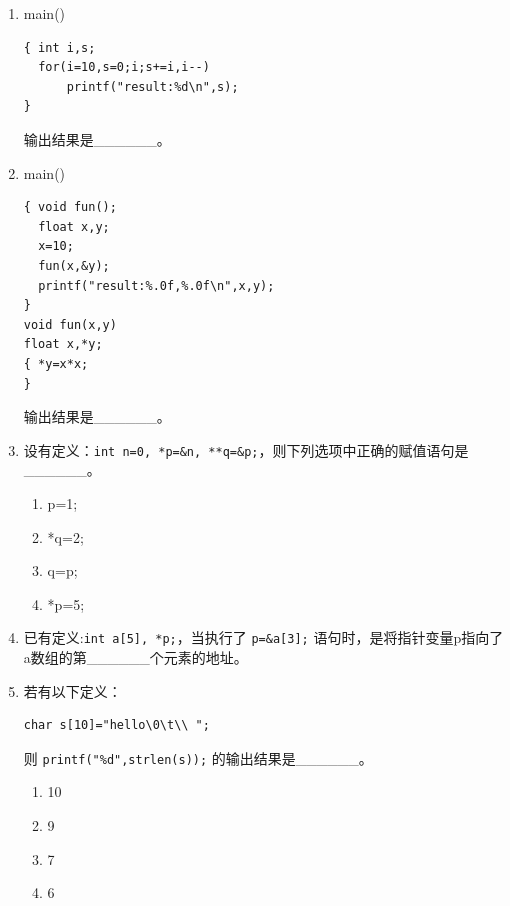 \documentclass[a4paper,12pt]{article}
\begin{document}
\begin{enumerate}
	\item main()
	      \begin{verbatim}
{ int i,s;
  for(i=10,s=0;i;s+=i,i--)
      printf("result:%d\n",s);
}
    \end{verbatim}
	      输出结果是\_\_\_\_\_\_。
	      \vspace{0.3cm}

	\item main()
	      \begin{verbatim}
{ void fun();
  float x,y;
  x=10;
  fun(x,&y);
  printf("result:%.0f,%.0f\n",x,y);
}
void fun(x,y)
float x,*y;
{ *y=x*x;
}
    \end{verbatim}
	      输出结果是\_\_\_\_\_\_。
	      \vspace{0.3cm}

	\item 设有定义：\texttt{int n=0, *p=\&n, **q=\&p;}，则下列选项中正确的赋值语句是\_\_\_\_\_\_。
	      \begin{enumerate}
		      \item[A)] p=1;
		      \item[B)] *q=2;
		      \item[C)] q=p;
		      \item[D)] *p=5;
	      \end{enumerate}
	      \vspace{0.3cm}

	\item 已有定义:\texttt{int a[5], *p;}，当执行了 \texttt{p=\&a[3];} 语句时，是将指针变量p指向了a数组的第\_\_\_\_\_\_个元素的地址。
	      \vspace{0.3cm}

	\item 若有以下定义：
	      \begin{verbatim}
char s[10]="hello\0\t\\ ";
      \end{verbatim}
	      则 \texttt{printf("\%d",strlen(s));} 的输出结果是\_\_\_\_\_\_。
	      \begin{enumerate}
		      \item[A)] 10
		      \item[B)] 9
		      \item[C)] 7
		      \item[D)] 6
	      \end{enumerate}
	      \vspace{0.3cm}


\end{enumerate}
\end{document}
